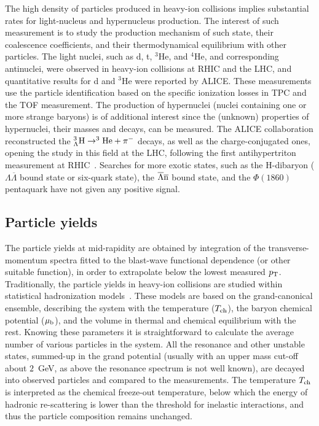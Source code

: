 The high density of particles produced in heavy-ion collisions implies substantial rates for light-nucleus and hypernucleus production. The interest of such measurement is to study the production mechanism of such state, their coalescence coefficients, and their thermodynamical equilibrium with other particles. The light nuclei, such as d, t, $^3$He, and $^4$He, and corresponding antinuclei, were observed in heavy-ion collisions at RHIC and the LHC, and quantitative results for d and $^3$He were reported by ALICE. These measurements use the particle identification based on the specific ionization losses in TPC and the TOF measurement. The production of hypernuclei (nuclei containing one or more strange baryons) is of additional interest since the (unknown) properties of hypernuclei, their masses and decays, can be measured. The ALICE collaboration reconstructed the $^3_{\Lambda}{\rm H} \rightarrow ^3{\rm He} + \pi^-$ decays, as well as the charge-conjugated ones, opening the study in this field at the LHC, following the first antihypertriton measurement at RHIC~\cite{Abelev:2010rv}. Searches for more exotic states, such as the H-dibaryon ($\Lambda\overline{\Lambda}$ bound state or six-quark state), the $\overline{\Lambda}\overline{\rm n}$ bound state, and the $\Phi(1860)$ pentaquark have not given any positive signal.
\subsection{Particle yields}
\label{subsecks:yields}
The particle yields at mid-rapidity are obtained by integration of the transverse-momentum spectra fitted to the blast-wave functional dependence (or other suitable function), in order to extrapolate below the lowest measured $p_{\rm T}$. Traditionally, the particle yields in heavy-ion collisions are studied within statistical hadronization models~\cite{Andronic:2008gu,Andronic:2011yq,Cleymans:1998fq,Becattini:2009fv}. These models are based on the grand-canonical ensemble, describing the system with the temperature ($T_{\rm ch}$), the baryon chemical potential ($\mu_{\rm b}$), and the volume in thermal and chemical equilibrium with the rest. Knowing these parameters it is straightforward to calculate the average number of various particles in the system. All the resonance and other unstable states, summed-up in the grand potential (usually with an upper mass cut-off about $2$~GeV, as above the resonance spectrum is not well known), are decayed into observed particles and compared to the measurements. The temperature $T_{\rm ch}$ is interpreted as the chemical freeze-out temperature, below which the energy of hadronic re-scattering is lower than the threshold for inelastic interactions, and thus the particle composition remains unchanged.

